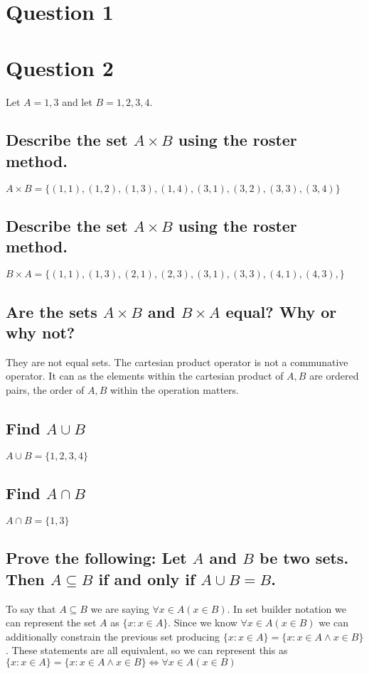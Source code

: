 \documentclass{article}
\newcommand{\YearPath}{../../../LatexConfig} %
\newcommand{\SemesterPath}{../../LatexConfig} %
\newcommand{\ClassPath}{../LatexConfig} %
\begin{document}




\section{Question 1}

\newpage

\section{Question 2}
Let $A = {1,3}$ and let $B = {1,2,3,4}$.
\subsection{Describe the set $A \times B$ using the roster method.}
$A \times B = \{(1,1), (1, 2), (1, 3), (1, 4), (3,1), (3, 2), (3, 3), (3, 4)\}$

\subsection{Describe the set $A \times B$ using the roster method.}
$B \times A = \{(1, 1), (1, 3), (2, 1), (2, 3), (3, 1), (3, 3), (4, 1), (4, 3), \}$

\subsection{Are the sets $A \times B$ and $B \times A$ equal? Why or why not?}
They are not equal sets. The cartesian product operator is not a communative operator. It can as the elements within the cartesian product of $A, B$ are ordered pairs, the order of $A, B$ within the operation matters. 

\subsection{Find $A \cup B$}
$A \cup B = \{1, 2, 3, 4\}$

\subsection{Find $A \cap B$}
$A \cap B = \{1, 3\}$

\subsection{Prove the following: Let $A$ and $B$ be two sets. Then $A \subseteq B$ if and only if $A \cup B = B$.}
To say that $A \subseteq B$ we are saying $\forall x \in A (x \in B)$. In set builder notation we can represent the set $A$ as $\{x : x \in A\}$. Since we know $\forall x \in A (x \in B)$ we can additionally constrain the previous set producing $\{x : x \in A\} = \{x : x \in A \land x \in B\}$. These statements are all equivalent, so we can represent this as $\{x : x \in A\} = \{x : x \in A \land x \in B\} \iff \forall x \in A (x \in B)$
\end{document}
